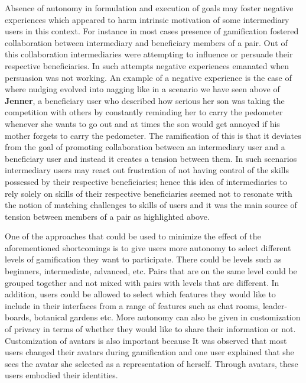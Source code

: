 Absence of autonomy in formulation and execution of goals may foster  negative experiences which appeared to harm intrinsic motivation of some intermediary users in this context. For instance in most cases presence of gamification fostered collaboration between intermediary and beneficiary members of a pair. Out of this collaboration intermediaries were attempting to influence or persuade their respective beneficiaries. In such attempts negative experiences emanated when persuasion was not working. An example of a negative experience is the case of where nudging evolved into nagging like in a scenario we have seen above of \textbf{Jenner}, a beneficiary user who described how serious her son was taking the competition with others by constantly reminding her to carry the pedometer whenever she wants to go out and at times the son would get annoyed if his mother forgets to carry the pedometer. The ramification of this is that it deviates from the goal of promoting collaboration between an intermediary user and a beneficiary user and instead it creates a tension between them.  
In such scenarios intermediary users may react out frustration of not having control of the skills possessed by their respective beneficiaries; hence this idea of intermediaries to rely solely on skills of their respective beneficiaries seemed not to resonate with the notion of matching challenges to skills of users and it was the main source of tension between members of a pair as highlighted above. 

One of the approaches that could be used to minimize the effect of the  aforementioned shortcomings is to give users more autonomy to select different levels of gamification they want to participate. There could be levels such as beginners, intermediate, advanced, etc. Pairs that are on the same level could be grouped together and not mixed with pairs with levels that are different. In addition, users could be allowed to select which features they would like to include in their interfaces from a range of features such as chat rooms, leader-boards, botanical gardens etc. More autonomy can also be given in customization of privacy in terms of whether they would like to share their information or not. Customization of avatars is also important because It was observed that most users changed their avatars during gamification and one user explained that she sees the avatar she selected as a representation of herself. Through avatars, these users embodied their identities.

